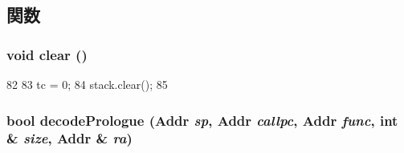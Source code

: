 \subsection{関数}
\hypertarget{classX86ISA_1_1StackTrace_ac8bb3912a3ce86b15842e79d0b421204}{
\subsubsection[{clear}]{\setlength{\rightskip}{0pt plus 5cm}void clear ()}}
\label{classX86ISA_1_1StackTrace_ac8bb3912a3ce86b15842e79d0b421204}



\begin{DoxyCode}
82         {
83             tc = 0;
84             stack.clear();
85         }
\end{DoxyCode}
\hypertarget{classX86ISA_1_1StackTrace_a875eea16b2891accc8cbec7eb6c36003}{
\subsubsection[{decodePrologue}]{\setlength{\rightskip}{0pt plus 5cm}bool decodePrologue ({\bf Addr} {\em sp}, \/  {\bf Addr} {\em callpc}, \/  {\bf Addr} {\em func}, \/  int \& {\em size}, \/  {\bf Addr} \& {\em ra})}}
\label{classX86ISA_1_1StackTrace_a875eea16b2891accc8cbec7eb6c36003}



